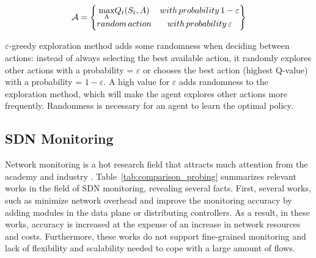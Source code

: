 \begin{equation}
    \begin{split}
       \mathcal{A} = \begin{Bmatrix}
            \underset{\rm A}{\rm max} Q_{t}(S_{t},A) & with \thinspace probability\thinspace 1-\varepsilon \\ 
            random\thinspace action & with\thinspace probability \thinspace \varepsilon
        \end{Bmatrix}
    \end{split}
    \label{equ:e-greedy}
\end{equation}

$\varepsilon$-greedy exploration method adds some randomness when deciding between actions: instead of always selecting the best available action, it randomly explores other actions with a probability = $\varepsilon$ or chooses the best action (highest Q-value) with a probability = $1-\varepsilon$. A high value for $\varepsilon$ adds randomness to the exploration method, which will make the agent explores other actions more frequently. Randomness is necessary for an agent to learn the optimal policy.

\subsection{SDN Monitoring}
\label{subsec:related_work}
Network monitoring is a hot research field that attracts much attention from the academy and industry \cite{feamster_2014:road_sdn,Boutaba2018,8255757}. Table~\ref{tab:comparison_probing} summarizes relevant works in the field of SDN monitoring, revealing several facts. First, several works, such as 
\cite{Sun_2015:HONE,phan2017:sdn_mon,liao_2018:LLDP-looping,jose_2011:online_measurement,tangari_2017:decentralized_monitoring,Tangari_2018:adaptive_decentralized_monitoring,phan2017:adaptive_sdn_mon,tahaei_2018:cost_effective} minimize network overhead and improve the monitoring accuracy by adding modules in the data plane or distributing controllers.
As a result, in these works, accuracy is increased at the expense of an increase in network resources and costs. Furthermore, these works do not support fine-grained monitoring and lack of flexibility and scalability needed to cope with a large amount of flows.

